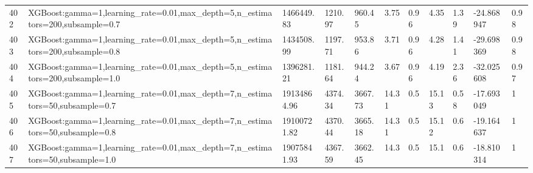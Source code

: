 \begin{longtable}{C{0.8cm} L{2cm} C{1.15cm} C{1.15cm} C{1.15cm} C{1.15cm} C{0.85cm} C{1.25cm} C{1.2cm} C{1.5cm} C{1.0cm}}
402 & XGBoost:\newline gamma=1,\newline learning\_rate=0.01,\newline max\_depth=5,\newline n\_estimators=200,\newline subsample=0.7 & 1466449.83 & 1210.97 & 960.45 & 3.75 & 0.96 & 4.35 & 1.39 & -24.868947 & 0.98 \\
403 & XGBoost:\newline gamma=1,\newline learning\_rate=0.01,\newline max\_depth=5,\newline n\_estimators=200,\newline subsample=0.8 & 1434508.99 & 1197.71 & 953.86 & 3.71 & 0.96 & 4.28 & 1.41 & -29.698369 & 0.98 \\
404 & XGBoost:\newline gamma=1,\newline learning\_rate=0.01,\newline max\_depth=5,\newline n\_estimators=200,\newline subsample=1.0 & 1396281.21 & 1181.64 & 944.24 & 3.67 & 0.96 & 4.19 & 2.36 & -32.025608 & 0.97 \\
405 & XGBoost:\newline gamma=1,\newline learning\_rate=0.01,\newline max\_depth=7,\newline n\_estimators=50,\newline subsample=0.7 & 19134864.96 & 4374.34 & 3667.73 & 14.31 & 0.5 & 15.13 & 0.58 & -17.693049 & 1 \\
406 & XGBoost:\newline gamma=1,\newline learning\_rate=0.01,\newline max\_depth=7,\newline n\_estimators=50,\newline subsample=0.8 & 19100721.82 & 4370.44 & 3665.18 & 14.31 & 0.5 & 15.12 & 0.6 & -19.164637 & 1 \\
407 & XGBoost:\newline gamma=1,\newline learning\_rate=0.01,\newline max\_depth=7,\newline n\_estimators=50,\newline subsample=1.0 & 19075841.93 & 4367.59 & 3662.45 & 14.3 & 0.5 & 15.1 & 0.6 & -18.810314 & 1 \\

\end{longtable}
